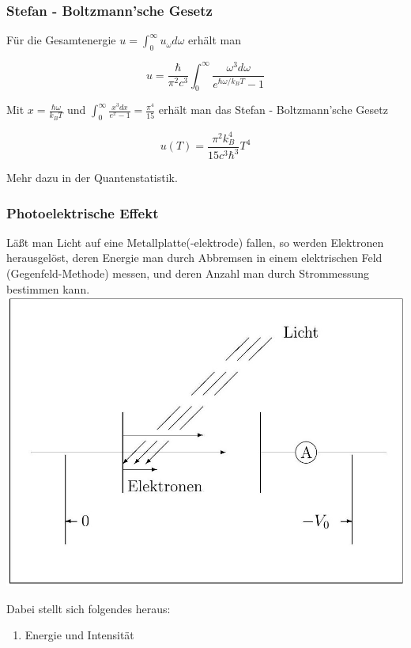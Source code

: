\documentclass[10pt, letterpaper]{article}
\begin{document}
\subsubsection*{Stefan - Boltzmann'sche Gesetz}
Für die Gesamtenergie $u=\int_{0}^{\infty} u_{\omega} d \omega$ erhält man

$$
u=\frac{\hbar}{\pi^{2} c^{3}} \int_{0}^{\infty} \frac{\omega^{3} d \omega}{e^{\hbar \omega / k_{B} T}-1}
$$

Mit $x=\frac{\hbar \omega}{k_{B} T}$ und $\int_{0}^{\infty} \frac{x^{3} d x}{e^{x}-1}=\frac{\pi^{4}}{15}$ erhält man das Stefan - Boltzmann'sche Gesetz

$$
u(T)=\frac{\pi^{2} k_{B}^{4}}{15 c^{3} \hbar^{3}} T^{4}
$$

Mehr dazu in der Quantenstatistik.



\subsubsection*{Photoelektrische Effekt}
Läßt man Licht auf eine Metallplatte(-elektrode) fallen, so werden Elektronen herausgelöst, deren Energie man durch Abbremsen in einem elektrischen Feld (Gegenfeld-Methode) messen, und deren Anzahl man durch Strommessung bestimmen kann.\\
\includegraphics[scale=0.2, center]{2025_05_21_7e716008973ee1b5e8beg-05}

Dabei stellt sich folgendes heraus:

\begin{enumerate}
  \item Energie und Intensität
\end{enumerate}
\end{document}
